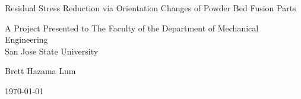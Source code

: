 \begin{titlepage}
  \centering
  \vspace*{3in}

  {\huge Residual Stress Reduction via Orientation Changes of Powder Bed Fusion Parts\par}

  \vspace{1cm}

  {\Large A Project Presented to The Faculty of the Department of Mechanical Engineering\\
  San Jose State University\par}

  \vspace{3in}

  {\large Brett Hazama Lum\par}

  \vfill

  {\large \today\par}
\end{titlepage}

\clearpage